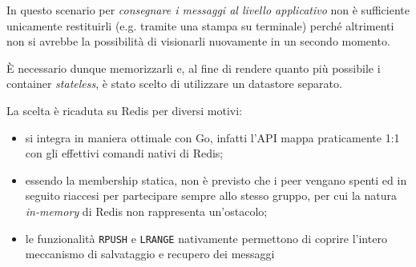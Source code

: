 \documentclass[conference]{IEEEtran}
\begin{document}
In questo scenario per \textit{consegnare i messaggi al livello applicativo} non è sufficiente unicamente restituirli (e.g. tramite una stampa su terminale) perché altrimenti non si avrebbe la possibilità di visionarli nuovamente in un secondo momento.

È necessario dunque memorizzarli e, al fine di rendere quanto più possibile i container \textit{stateless}, è stato scelto di utilizzare un datastore separato.

La scelta è ricaduta su Redis per diversi motivi:
\begin{itemize}
\item si integra in maniera ottimale con Go, infatti l'API mappa praticamente 1:1 con gli effettivi comandi nativi di Redis;
\item essendo la membership statica, non è previsto che i peer vengano spenti ed in seguito riaccesi per partecipare sempre allo stesso gruppo, per cui la natura \textit{in-memory} di Redis non rappresenta un'ostacolo;
\item le funzionalità \texttt{RPUSH} e \texttt{LRANGE} nativamente permettono di coprire l'intero meccanismo di salvataggio e recupero dei messaggi
\end{itemize}
\end{document}
